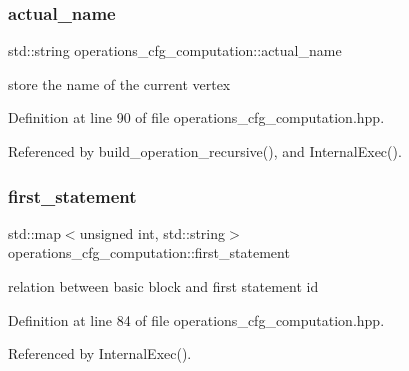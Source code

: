 \subsubsection{\texorpdfstring{actual\+\_\+name}{actual\_name}}
{\footnotesize\ttfamily std\+::string operations\+\_\+cfg\+\_\+computation\+::actual\+\_\+name\hspace{0.3cm}{\ttfamily [private]}}



store the name of the current vertex 



Definition at line 90 of file operations\+\_\+cfg\+\_\+computation.\+hpp.



Referenced by build\+\_\+operation\+\_\+recursive(), and Internal\+Exec().

\mbox{\label{classoperations__cfg__computation_af1b5e6119a42455a86fa01e3f3ec3f4b}} 
\subsubsection{\texorpdfstring{first\+\_\+statement}{first\_statement}}
{\footnotesize\ttfamily std\+::map$<$unsigned int, std\+::string$>$ operations\+\_\+cfg\+\_\+computation\+::first\+\_\+statement\hspace{0.3cm}{\ttfamily [private]}}



relation between basic block and first statement id 



Definition at line 84 of file operations\+\_\+cfg\+\_\+computation.\+hpp.



Referenced by Internal\+Exec().

\mbox{\label{classoperations__cfg__computation_a376558dd1ae44b3a523bc4482fd9f9ec}} 
